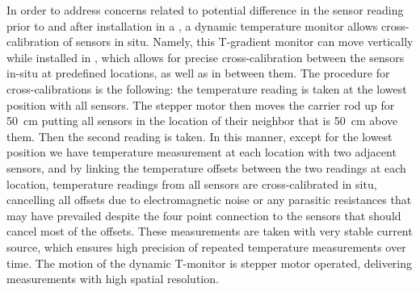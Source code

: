 
 In order to address concerns related to potential difference in the sensor reading prior to %
 and after installation in a , a dynamic temperature monitor allows cross-calibration of sensors in situ. Namely, this T-gradient monitor  can move vertically while installed in , which allows for precise cross-calibration between the sensors in-situ at predefined locations, as well as in between them. 
 The procedure for cross-calibrations is the following: the temperature reading is taken at the lowest position with all sensors. The stepper motor then moves the carrier rod up for \SI{50}{cm} 
  putting all sensors in the location of their neighbor that is \SI{50}{cm} above them. Then the second reading is taken. In this manner, except for the lowest position we have temperature measurement at each location with two adjacent sensors, and by linking the temperature offsets between the two readings at each location, temperature readings from all sensors are cross-calibrated in situ, cancelling all offsets due to electromagnetic noise or any parasitic resistances that may have prevailed despite the four point connection to the sensors that should cancel most of the offsets. These measurements are taken with very stable current source, which ensures high precision of repeated temperature measurements over time. The motion of the dynamic T-monitor is stepper motor operated, delivering measurements with high spatial resolution. 


